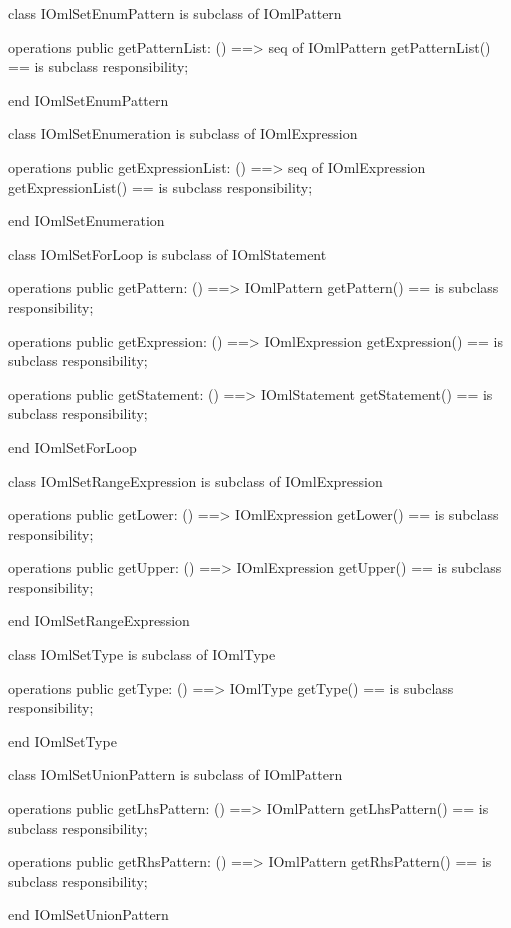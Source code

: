 \begin{vdm_al}
class IOmlSetEnumPattern
 is subclass of IOmlPattern

operations
  public getPatternList: () ==> seq of IOmlPattern
  getPatternList() == is subclass responsibility;

end IOmlSetEnumPattern
\end{vdm_al}

\begin{vdm_al}
class IOmlSetEnumeration
 is subclass of IOmlExpression

operations
  public getExpressionList: () ==> seq of IOmlExpression
  getExpressionList() == is subclass responsibility;

end IOmlSetEnumeration
\end{vdm_al}

\begin{vdm_al}
class IOmlSetForLoop
 is subclass of IOmlStatement

operations
  public getPattern: () ==> IOmlPattern
  getPattern() == is subclass responsibility;

operations
  public getExpression: () ==> IOmlExpression
  getExpression() == is subclass responsibility;

operations
  public getStatement: () ==> IOmlStatement
  getStatement() == is subclass responsibility;

end IOmlSetForLoop
\end{vdm_al}

\begin{vdm_al}
class IOmlSetRangeExpression
 is subclass of IOmlExpression

operations
  public getLower: () ==> IOmlExpression
  getLower() == is subclass responsibility;

operations
  public getUpper: () ==> IOmlExpression
  getUpper() == is subclass responsibility;

end IOmlSetRangeExpression
\end{vdm_al}

\begin{vdm_al}
class IOmlSetType
 is subclass of IOmlType

operations
  public getType: () ==> IOmlType
  getType() == is subclass responsibility;

end IOmlSetType
\end{vdm_al}

\begin{vdm_al}
class IOmlSetUnionPattern
 is subclass of IOmlPattern

operations
  public getLhsPattern: () ==> IOmlPattern
  getLhsPattern() == is subclass responsibility;

operations
  public getRhsPattern: () ==> IOmlPattern
  getRhsPattern() == is subclass responsibility;

end IOmlSetUnionPattern
\end{vdm_al}

